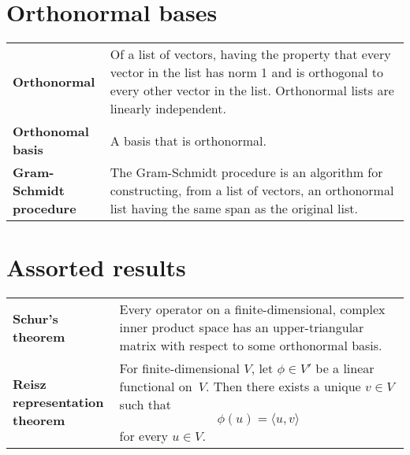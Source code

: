 \documentclass[10pt, a4paper, landscape]{article}
\newcommand{\defn}[1]{\textbf{#1}}
\newcommand{\inner}[2]{{\langle #1,#2 \rangle}}
\newlength{\termheaderwd}
\begin{document}
\begin{multicols*}{3}
\section*{Orthonormal bases}
\begin{tabularx}{\columnwidth}{@{}l>{\raggedright\arraybackslash}X@{}}
  \toprule
  \defn{Orthonormal} & Of a list of vectors, having the property that every vector in the list has norm 1 and is orthogonal to every other vector in the list. Orthonormal lists are linearly independent. \\

  \parbox[t]{\termheaderwd}{\defn{Orthonomal\\ basis}}
  & A basis that is orthonormal. \\

  \parbox[t]{\termheaderwd}{\defn{Gram-Schmidt\\ procedure}}
                     & The Gram-Schmidt procedure is an algorithm for constructing, from a list of vectors, an orthonormal list having the same span as the original list. \\

\end{tabularx}


\section*{Assorted results}
\begin{tabularx}{\columnwidth}{@{}l>{\raggedright\arraybackslash}X@{}}
  \toprule
  \settowidth{\termheaderwd}{representation}%
  \defn{Schur's theorem} & Every operator on a finite-dimensional, complex inner product space has an upper-triangular matrix with respect to some orthonormal basis. \\ 

  \parbox[t]{\termheaderwd}{\defn{Reisz\\ representation\\ theorem}} 
                      & For finite-dimensional $V$, let $\phi\in V'$ be a linear functional on~$V$. Then there exists a unique $v\in V$ such that
                        \begin{equation*}
                          \phi(u)  = \inner{u}{v}
                        \end{equation*}
                        for every $u\in V$. \\
\end{tabularx}


\end{multicols*}
\end{document}
